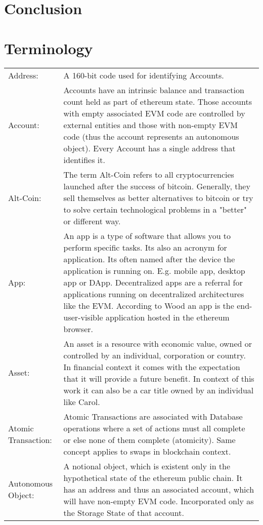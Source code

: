 \chapter{Conclusion}
\label{ch:chapter07}


\chapter{Terminology}
\label{ch:chapter08}

\begin{center}
	\begin{tabular}{ p{4cm} p{8cm} } 
		Address: & A 160-bit code used for identifying Accounts.  \\ 
		Account: & Accounts have an intrinsic balance and transaction count held as part of ethereum state. Those accounts with empty associated \ac{EVM} code are controlled by external entities and those with non-empty \ac{EVM} code (thus the account represents an autonomous object). Every Account has a single address that identifies it. \\
		Alt-Coin: & The term Alt-Coin refers to all cryptocurrencies launched after the success of bitcoin. Generally, they sell themselves as better alternatives to bitcoin or try to solve certain technological problems in a "better" or different way. \\
		App: & An app is a type of software that allows you to perform specific tasks. Its also an acronym for application. Its often named after the device the application is running on. E.g. mobile app, desktop app or \ac{DApp}. Decentralized apps are a referral for applications running on decentralized architectures like the \ac{EVM}. According to Wood an app is the end-user-visible application hosted in the ethereum browser. \\
		Asset: & An asset is a resource with economic value, owned or controlled by an individual, corporation or country. In financial context it comes with the expectation that it will provide a future benefit. In context of this work it can also be a car title owned by an individual like Carol.\\
		Atomic Transaction: & Atomic Transactions are associated with Database operations where a set of actions must all complete or else none of them complete (atomicity). Same concept applies to swaps in blockchain context. \\
		Autonomous Object: & A notional object, which is existent only in the hypothetical state of the ethereum public chain. It has an address and thus an associated account, which will have non-empty \ac{EVM} code. Incorporated only as the Storage State of that account. \\
	\end{tabular}
\end{center}


